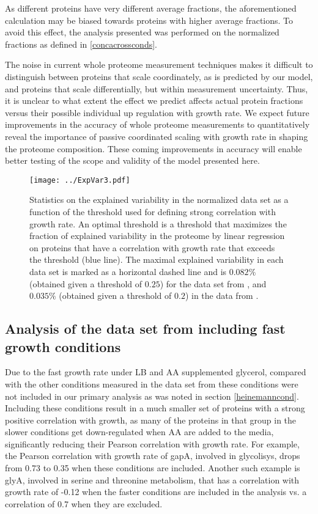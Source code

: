 \documentclass{article}
\newcommand{\hMaxExpVar}{0.082}
\newcommand{\vnMaxExpVar}{0.035}
\newcommand{\vMaxExpVar}{\vnMaxExpVar{}}
\begin{document}
As different proteins have very different average fractions, the aforementioned calculation may be biased towards proteins with higher average fractions.
To avoid this effect, the analysis presented was performed on the normalized fractions as defined in \ref{concacrossconds}.

The noise in current whole proteome measurement techniques makes it difficult to distinguish between proteins that scale coordinately, as is predicted by our model, and proteins that scale differentially, but within measurement uncertainty.
Thus, it is unclear to what extent the effect we predict affects actual protein fractions versus their possible individual up regulation with growth rate.
We expect future improvements in the accuracy of whole proteome measurements to quantitatively reveal the importance of passive coordinated scaling with growth rate in shaping the proteome composition. These coming improvements in accuracy will enable better testing of the scope and validity of the model presented here.

\begin{figure}[H]
\begin{center}
\texttt{[image: ../ExpVar3.pdf]}
\caption{\label{fig:threshold}
  Statistics on the explained variability in the normalized data set as a function of the threshold used for defining strong correlation with growth rate.
  An optimal threshold is a threshold that maximizes the fraction of explained variability in the proteome by linear regression on proteins that have a correlation with growth rate that exceeds the threshold (blue line).
  The maximal explained variability in each data set is marked as a horizontal dashed line and is $\hMaxExpVar{}\%$ (obtained given a threshold of $0.25$) for the data set from \cite{Schmidt2015}, and $\vMaxExpVar{}\%$ (obtained given a threshold of $0.2$) in the data from \cite{Peebo_2015}.
%
}
\end{center}
\end{figure}

\subsection{Analysis of the data set from \cite{Schmidt2015} including fast growth conditions}
\label{lbanalysis}
Due to the fast growth rate under LB and AA supplemented glycerol, compared with the other conditions measured in the data set from \cite{Schmidt2015} these conditions were not included in our primary analysis as was noted in section \ref{heinemanncond}.
Including these conditions result in a much smaller set of proteins with a strong positive correlation with growth, as many of the proteins in that group in the slower conditions get down-regulated when AA are added to the media, significantly reducing their Pearson correlation with growth rate.
For example, the Pearson correlation with growth rate of gapA, involved in glycolisys, drops from 0.73 to 0.35 when these conditions are included.
Another such example is glyA, involved in serine and threonine metabolism, that has a correlation with
growth rate of -0.12 when the faster conditions are included in the analysis vs. a correlation of 0.7 when they are excluded.
\end{document}
